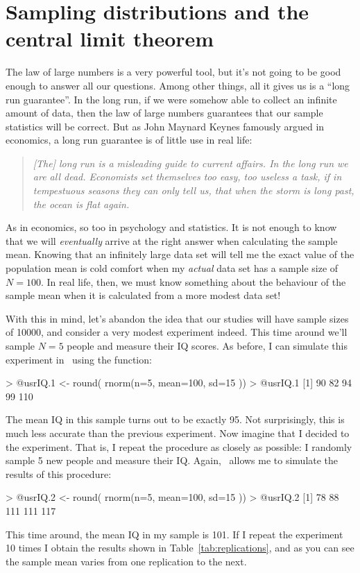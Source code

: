 \section{Sampling distributions and the central limit theorem~\label{sec:samplesandclt}}

The law of large numbers is a very powerful tool, but it's not going to be good enough to answer all our questions. Among other things, all it gives us is a ``long run guarantee''. In the long run, if we were somehow able to collect an infinite amount of data, then the law of large numbers guarantees that our sample statistics will be correct. But as John Maynard Keynes famously argued in economics, a long run guarantee is of little use in real life:
\begin{quote}
{\it [The] long run is a misleading guide to current affairs. In the long run we are all dead. Economists set themselves too easy, too useless a task, if in tempestuous seasons they can only tell us, that when the storm is long past, the ocean is flat again.} \cite[p.~80]{Keynes1923}
\end{quote}
As in economics, so too in psychology and statistics. It is not enough to know that we will {\it eventually} arrive at the right answer when calculating the sample mean. Knowing that an infinitely large data set will tell me the exact value of the population mean is cold comfort when my {\it actual} data set has a sample size of $N=100$. In real life, then, we must know something about the behaviour of the sample mean when it is calculated from a more modest data set!


With this in mind, let's abandon the idea that our studies will have sample sizes of 10000, and consider a very modest experiment indeed. This time around we'll sample $N=5$ people and measure their IQ scores. As before, I can simulate this experiment in \R\ using the  function:
\begin{rblock1}
> @usr{IQ.1 <- round( rnorm(n=5, mean=100, sd=15 ))}
> @usr{IQ.1}
[1]  90  82  94  99 110
\end{rblock1}
The mean IQ in this sample turns out to be exactly 95. Not surprisingly, this is much less accurate than the previous experiment. Now imagine that I decided to  the experiment. That is, I repeat the procedure as closely as possible: I randomly sample 5 new people and measure their IQ. Again, \R\ allows me to simulate the results of this procedure:
\begin{rblock1}
> @usr{IQ.2 <- round( rnorm(n=5, mean=100, sd=15 ))}
> @usr{IQ.2}
[1]  78  88 111 111 117
\end{rblock1}
This time around, the mean IQ in my sample is 101. If I repeat the experiment 10 times I obtain the results shown in Table~\ref{tab:replications}, and as you can see the sample mean varies from one replication to the next. 

